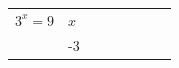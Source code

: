 {        \begin{center}
      
      \label{m39253*id154772}
      
    \noindent
      \tablelasttail{}
      \begin{xtabular*}{\mytablewidth}[t]{|p{10\mystarwidth}|p{10\mystarwidth}|p{10\mystarwidth}|p{10\mystarwidth}|p{10\mystarwidth}|p{10\mystarwidth}|p{10\mystarwidth}|p{10\mystarwidth}|}\hline
    
    
        
                \begin{math}{3}^{x}=9\end{math}
               &
     \tabularnewline{}
    
    
         &
    
    
        -3 &
    
    

\end{xtabular*}
\end{center}}
